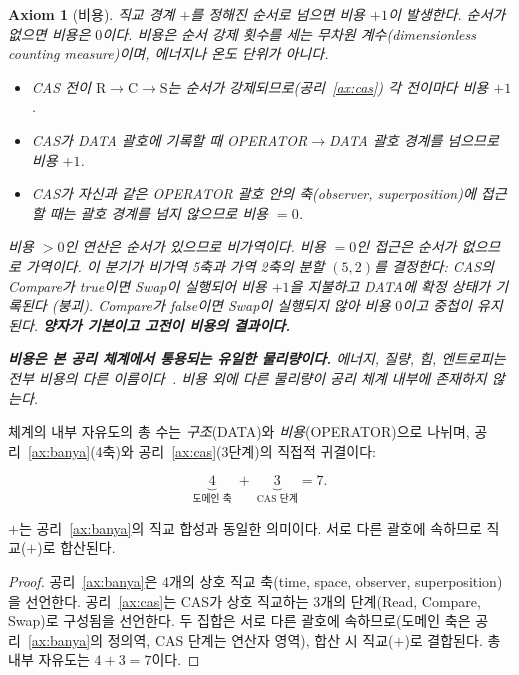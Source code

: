 \documentclass[entropy,article,submit,pdftex,oneauthor]{Definitions/mdpi}
\newtheorem{Axiom}{Axiom}
\begin{document}
\begin{Axiom}[비용]\label{ax:cost}
직교 경계 $+$를 정해진 순서로 넘으면 비용 $+1$이 발생한다. 순서가 없으면 비용은 $0$이다. 비용은 순서 강제 횟수를 세는 무차원 계수(dimensionless counting measure)이며, 에너지나 온도 단위가 아니다.
\begin{itemize}
\item CAS 전이 $\mathrm{R} \to \mathrm{C} \to \mathrm{S}$는 순서가 강제되므로(공리~\ref{ax:cas}) 각 전이마다 비용 $+1$.
\item CAS가 DATA 괄호에 기록할 때 OPERATOR$\to$DATA 괄호 경계를 넘으므로 비용 $+1$.
\item CAS가 자신과 같은 OPERATOR 괄호 안의 축(observer, superposition)에 접근할 때는 괄호 경계를 넘지 않으므로 비용 $= 0$.
\end{itemize}
비용 $> 0$인 연산은 순서가 있으므로 비가역이다. 비용 $= 0$인 접근은 순서가 없으므로 가역이다. 이 분기가 비가역 5축과 가역 2축의 분할 $(5,2)$를 결정한다: CAS의 Compare가 true이면 Swap이 실행되어 비용 $+1$을 지불하고 DATA에 확정 상태가 기록된다 (붕괴). Compare가 false이면 Swap이 실행되지 않아 비용 $0$이고 중첩이 유지된다. \textbf{양자가 기본이고 고전이 비용의 결과이다.}

\textbf{비용은 본 공리 체계에서 통용되는 유일한 물리량이다.} 에너지, 질량, 힘, 엔트로피는 전부 비용의 다른 이름이다~\cite{han2026}. 비용 외에 다른 물리량이 공리 체계 내부에 존재하지 않는다.
\end{Axiom}

\begin{Lemma}[완전기술자유도]\label{ax:dof}
체계의 내부 자유도의 총 수는 \emph{구조}(DATA)와 \emph{비용}(OPERATOR)으로 나뉘며, 공리~\ref{ax:banya}(4축)와 공리~\ref{ax:cas}(3단계)의 직접적 귀결이다:
\begin{linenomath}
\begin{equation}
\underbrace{4}_{\text{도메인 축}} \;+\; \underbrace{3}_{\text{CAS 단계}} = 7.
\label{eq:dof7}
\end{equation}
\end{linenomath}
$+$는 공리~\ref{ax:banya}의 직교 합성과 동일한 의미이다. 서로 다른 괄호에 속하므로 직교($+$)로 합산된다.
\end{Lemma}

\begin{proof}
공리~\ref{ax:banya}은 4개의 상호 직교 축(time, space, observer, superposition)을 선언한다. 공리~\ref{ax:cas}는 CAS가 상호 직교하는 3개의 단계(Read, Compare, Swap)로 구성됨을 선언한다. 두 집합은 서로 다른 괄호에 속하므로(도메인 축은 공리~\ref{ax:banya}의 정의역, CAS 단계는 연산자 영역), 합산 시 직교($+$)로 결합된다. 총 내부 자유도는 $4 + 3 = 7$이다.
\end{proof}
\end{document}
